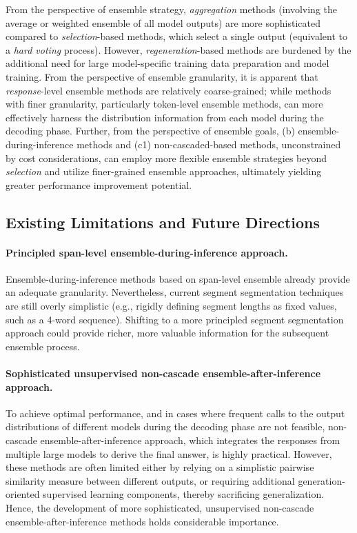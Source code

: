 \documentclass{article}
\begin{document}
From the perspective of ensemble strategy, \textit{aggregation} methods (involving the average or weighted ensemble of all model outputs) are more sophisticated compared to \textit{selection}-based methods, which select a single output (equivalent to a \textit{hard voting} process). 
However, \textit{regeneration}-based methods are burdened by the additional need for large model-specific training data preparation and model training.
From the perspective of ensemble granularity, it is apparent that \textit{response}-level ensemble methods are relatively coarse-grained; while methods with finer granularity, particularly token-level ensemble methods, can
more effectively harness the distribution information from each model during the decoding phase.
Further, from the perspective of ensemble goals, (b) ensemble-during-inference methods and (c1) non-cascaded-based methods, unconstrained by cost considerations, can employ more flexible ensemble strategies beyond \textit{selection} and utilize finer-grained ensemble approaches, ultimately yielding greater performance improvement potential.






\subsection{Existing Limitations and Future Directions}


\paragraph{Principled span-level ensemble-during-inference approach.}
Ensemble-during-inference methods based on span-level ensemble already provide an adequate granularity.
Nevertheless, current segment segmentation techniques are still overly simplistic (e.g., rigidly defining segment lengths as fixed values, such as a 4-word sequence).
Shifting to a more principled segment segmentation approach could provide richer, more valuable information for the subsequent ensemble process.


\paragraph{Sophisticated unsupervised non-cascade ensemble-after-inference approach.}
To achieve optimal performance, and in cases where frequent calls to the output distributions of different models during the decoding phase are not feasible, non-cascade ensemble-after-inference approach, which integrates the responses from multiple large models to derive the final answer, is highly practical.
However, these methods are often limited either by relying on a simplistic pairwise similarity measure between different outputs, or requiring additional generation-oriented supervised learning components, thereby sacrificing generalization.
Hence, the development of more sophisticated, unsupervised non-cascade ensemble-after-inference methods holds considerable importance.
\end{document}
